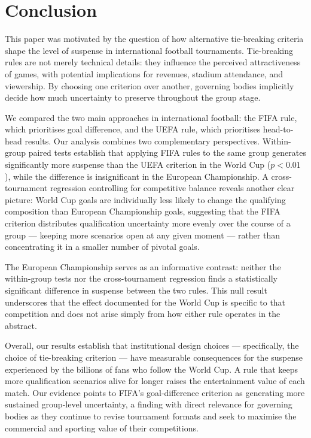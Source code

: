 \documentclass[11pt]{article}
\begin{document}





\section{Conclusion}
\label{sec:conclusion}

This paper was motivated by the question of how alternative tie-breaking criteria shape the level of suspense in international football tournaments. Tie-breaking rules are not merely technical details: they influence the perceived attractiveness of games, with potential implications for revenues, stadium attendance, and viewership. By choosing one criterion over another, governing bodies implicitly decide how much uncertainty to preserve throughout the group stage.

We compared the two main approaches in international football: the FIFA rule, which prioritises goal difference, and the UEFA rule, which prioritises head-to-head results. Our analysis combines two complementary perspectives. Within-group paired tests establish that applying FIFA rules to the same group generates significantly more suspense than the UEFA criterion in the World Cup ($p < 0.01$), while the difference is insignificant in the European Championship. A cross-tournament regression controlling for competitive balance reveals another clear picture: World Cup goals are individually less likely to change the qualifying composition than European Championship goals, suggesting that the FIFA criterion distributes qualification uncertainty more evenly over the course of a group — keeping more scenarios open at any given moment — rather than concentrating it in a smaller number of pivotal goals.

The European Championship serves as an informative contrast: neither the within-group tests nor the cross-tournament regression finds a statistically significant difference in suspense between the two rules. This null result underscores that the effect documented for the World Cup is specific to that competition and does not arise simply from how either rule operates in the abstract.

Overall, our results establish that institutional design choices — specifically, the choice of tie-breaking criterion — have measurable consequences for the suspense experienced by the billions of fans who follow the World Cup. A rule that keeps more qualification scenarios alive for longer raises the entertainment value of each match. Our evidence points to FIFA's goal-difference criterion as generating more sustained group-level uncertainty, a finding with direct relevance for governing bodies as they continue to revise tournament formats and seek to maximise the commercial and sporting value of their competitions.
\end{document}
